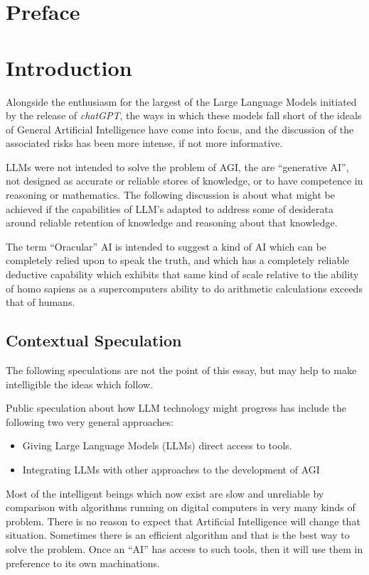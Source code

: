 \documentclass[10pt,titlepage]{book}
\begin{document}
\section*{Preface}

\section{Introduction}

Alongside the enthusiasm for the largest of the Large Language Models initiated by the release of \emph{chatGPT}, the ways in which these models fall short of the ideals of General Artificial Intelligence have come into focus, and the discussion of the associated risks has been more intense, if not more informative.

LLMs were not intended to solve the problem of AGI, the are ``generative AI'', not designed as accurate or reliable stores of knowledge, or to have competence in reasoning or mathematics.
The following discussion is about what might be achieved if the capabilities of LLM's adapted to address some of desiderata around reliable retention of knowledge and reasoning about that knowledge.

The term ``Oracular'' AI is intended to suggest a kind of AI which can be completely relied upon to speak the truth, and which has a completely reliable deductive capability which exhibits that same kind of scale relative to the ability of homo sapiens as a supercomputers ability to do arithmetic calculations exceeds that of humans.

\subsection{Contextual Speculation}

The following speculations are not the point of this essay, but may help to make intelligible the ideas which follow.

Public speculation about how LLM technology might progress has include the following two very general approaches:

\begin{itemize}
\item Giving Large Language Models (LLMs) direct access to tools.
\item Integrating LLMs with other approaches to the development of AGI
\end{itemize}

Most of the intelligent beings which now exist are slow and unreliable by comparison with algorithms running on digital computers in very many kinds of problem.
There is no reason to expect that Artificial Intelligence will change that situation.
Sometimes there is an efficient algorithm and that is the best way to solve the problem.
Once an ``AI'' has access to such tools, then it will use them in preference to its own machinations.
\end{document}
